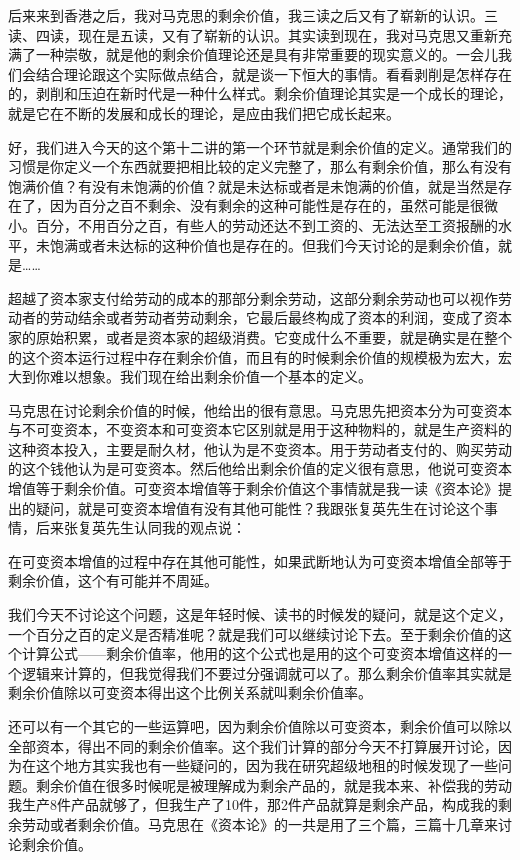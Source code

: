 \documentclass[UTF8, 12pt, a4paper]{ctexrep}
\begin{document}
后来来到香港之后，我对马克思的剩余价值，我三读之后又有了崭新的认识。三读、四读，现在是五读，又有了崭新的认识。其实读到现在，我对马克思又重新充满了一种崇敬，就是他的剩余价值理论还是具有非常重要的现实意义的。一会儿我们会结合理论跟这个实际做点结合，就是谈一下恒大的事情。看看剥削是怎样存在的，剥削和压迫在新时代是一种什么样式。剩余价值理论其实是一个成长的理论，就是它在不断的发展和成长的理论，是应由我们把它成长起来。

好，我们进入今天的这个第十二讲的第一个环节就是剩余价值的定义。通常我们的习惯是你定义一个东西就要把相比较的定义完整了，那么有剩余价值，那么有没有饱满价值？有没有未饱满的价值？就是未达标或者是未饱满的价值，就是当然是存在了，因为百分之百不剩余、没有剩余的这种可能性是存在的，虽然可能是很微小。百分，不用百分之百，有些人的劳动还达不到工资的、无法达至工资报酬的水平，未饱满或者未达标的这种价值也是存在的。但我们今天讨论的是剩余价值，就是……

超越了资本家支付给劳动的成本的那部分剩余劳动，这部分剩余劳动也可以视作劳动者的劳动结余或者劳动者劳动剩余，它最后最终构成了资本的利润，变成了资本家的原始积累，或者是资本家的超级消费。它变成什么不重要，就是确实是在整个的这个资本运行过程中存在剩余价值，而且有的时候剩余价值的规模极为宏大，宏大到你难以想象。我们现在给出剩余价值一个基本的定义。

马克思在讨论剩余价值的时候，他给出的很有意思。马克思先把资本分为可变资本与不可变资本，不变资本和可变资本它区别就是用于这种物料的，就是生产资料的这种资本投入，主要是耐久材，他认为是不变资本。用于劳动者支付的、购买劳动的这个钱他认为是可变资本。然后他给出剩余价值的定义很有意思，他说可变资本增值等于剩余价值。可变资本增值等于剩余价值这个事情就是我一读《资本论》提出的疑问，就是可变资本增值有没有其他可能性？我跟张复英先生在讨论这个事情，后来张复英先生认同我的观点说：

{\kaishu 在可变资本增值的过程中存在其他可能性，如果武断地认为可变资本增值全部等于剩余价值，这个有可能并不周延。}

我们今天不讨论这个问题，这是年轻时候、读书的时候发的疑问，就是这个定义，一个百分之百的定义是否精准呢？就是我们可以继续讨论下去。至于剩余价值的这个计算公式——剩余价值率，他用的这个公式也是用的这个可变资本增值这样的一个逻辑来计算的，但我觉得我们不要过分强调就可以了。那么剩余价值率其实就是剩余价值除以可变资本得出这个比例关系就叫剩余价值率。

还可以有一个其它的一些运算吧，因为剩余价值除以可变资本，剩余价值可以除以全部资本，得出不同的剩余价值率。这个我们计算的部分今天不打算展开讨论，因为在这个地方其实我也有一些疑问的，因为我在研究超级地租的时候发现了一些问题。剩余价值在很多时候呢是被理解成为剩余产品的，就是我本来、补偿我的劳动我生产8件产品就够了，但我生产了10件，那2件产品就算是剩余产品，构成我的剩余劳动或者剩余价值。马克思在《资本论》的一共是用了三个篇，三篇十几章来讨论剩余价值。
\end{document}
